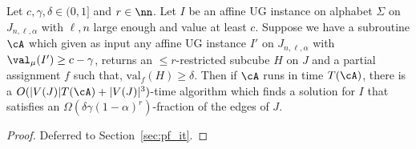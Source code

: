 \begin{lemma}\label{lem:subroutine}
Let $c,\gamma,\delta \in (0,1]$ and $r \in \nn$. Let $I$ be an affine UG instance on alphabet $\Sigma$ on $J_{n,\ell,\alpha}$ with $\ell, n$ large enough  and value at least $c$. 
Suppose we have a subroutine $\cA$ which given as input any affine UG instance $I'$ on $J_{n,\ell,\alpha}$ with $\val_\mu(I') \ge c-\gamma$, returns an $\leq r$-restricted subcube $H$ on $J$ and a partial assignment $f$ such that, $\text{val}_{f}(H) \geq \delta$.
Then if $\cA$ runs in time $T(\cA)$, there is a $O(|V(J)|T(\cA)+|V(J)|^3)$-time algorithm which finds a solution for $I$ that satisfies an $\Omega(\delta\gamma(1-\alpha)^r)$-fraction of the  edges of $J$. 
\end{lemma}
\begin{proof}
Deferred to Section~\ref{sec:pf_it}.
\end{proof}






